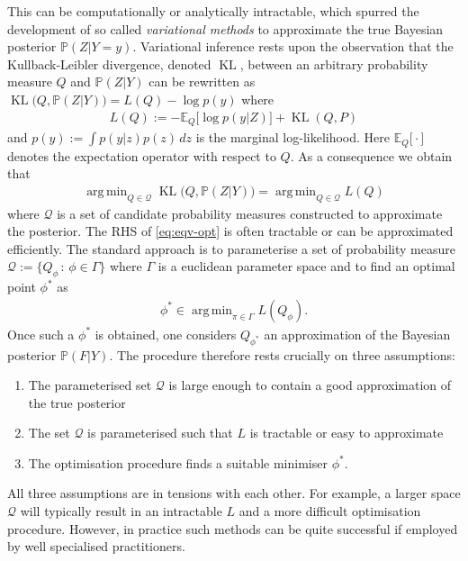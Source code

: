 \documentclass{article}
\newcommand{\bbP}{\mathbb{P}}
\newcommand{\bbE}{\mathbb{E}}
\newcommand{\calQ}{\mathcal{Q}}
\newcommand{\KL}{\operatorname{KL}}
\DeclareMathOperator*{\argmin}{arg\,min}
\numberwithin{equation}{section}
\begin{document}
This can be computationally or analytically intractable, which spurred the development of so called \textit{variational methods} to approximate the true Bayesian posterior $\bbP(Z|Y=y)$. Variational inference rests upon the observation that the Kullback-Leibler divergence, denoted $\KL$, between an arbitrary probability measure $Q$ and $\bbP(Z|Y)$ can be rewritten as $ \KL\big(Q , \bbP(Z|Y) \big) =  L(Q) - \log p(y)$ where
\begin{align}
   L(Q) := - \bbE_Q \big[ \log p(y|Z) \big] + \KL( Q, P)
\end{align}
 and $p(y):= \int p(y|z) p(z) \, dz $ is the marginal log-likelihood. Here $\bbE_Q \big[ \cdot \big] $ denotes the expectation operator with respect to $Q$. As a consequence we obtain that 
 \begin{align}
     \argmin_{ Q \in \calQ } \KL\big( Q, \bbP(Z|Y) \big) =  \argmin_{ Q \in \calQ } L(Q) \label{eq:eqv-opt}
 \end{align}
where $\mathcal{Q}$ is a set of candidate probability measures constructed to approximate the posterior. The RHS of \eqref{eq:eqv-opt} is often tractable or can be approximated efficiently. The standard approach is to parameterise a set of probability measure $\calQ := \{ Q_\phi \, : \, \phi \in \Gamma \}$ where $\Gamma$ is a euclidean parameter space and to find an optimal point $\phi^*$ as 
\begin{align}
    \phi^* \in \argmin_{\pi \in \Gamma} L(Q_\phi).
\end{align}
Once such a $\phi^*$ is obtained, one considers $Q_{\phi^*}$ an approximation of the Bayesian posterior $\bbP(F|Y)$. The procedure therefore rests crucially on three assumptions:
\begin{enumerate}
    \item The parameterised set $\calQ$ is large enough to contain a good approximation of the true posterior
    \item The set $\calQ$ is parameterised such that $L$ is tractable or easy to approximate
    \item The optimisation procedure finds a suitable minimiser $\phi^*$.
\end{enumerate}
All three assumptions are in tensions with each other. For example, a larger space $\calQ$ will typically result in an intractable $L$ and a more difficult optimisation procedure. However, in practice such methods can be quite successful if employed by well specialised practitioners. 
\end{document}
